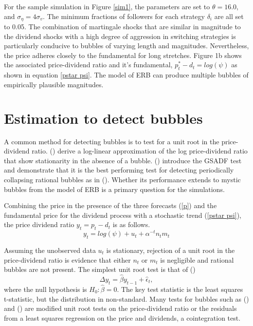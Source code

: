 \documentclass[12pt]{article}
\begin{document}
For the sample simulation in Figure \ref{sim1}, the parameters are set to $\theta=16.0$, and $\sigma_{\eta}=4\sigma_{v}$. The minimum fractions of followers for each strategy $\delta_{i}$ are all set to 0.05. The combination of martingale shocks that are similar in magnitude to the dividend shocks with a high degree of aggression in switching strategies is particularly conducive to bubbles of varying length and magnitudes. Nevertheless, the price adheres closely to the fundamental for long stretches. Figure 1b shows the associated price-dividend ratio and it's fundamental, $p^{*}_{t}-d_{t}=log(\psi)$ as shown in equation \ref{pstar psi}. The model of ERB can produce multiple bubbles of empirically plausible magnitudes.

\section{Estimation to detect bubbles}

A common method for detecting bubbles is to test for a unit root in the price-dividend ratio. \citeauthor{campbell1989dividend} (\citeyear{campbell1989dividend}) derive a log-linear approximation of the log price-dividend ratio that show stationarity in the absence of a bubble.
\citeauthor{phillips2015testing} (\citeyear{phillips2015testing}) introduce the GSADF test and demonstrate that it is the best performing test for detecting periodically collapsing rational bubbles as in \citeauthor{evans1991pitfalls} (\citeyear{evans1991pitfalls}). Whether its performance extends to mystic bubbles from the model of ERB is a primary question for the simulations. 

Combining the price in the presence of the three forecasts (\ref{p}) and the fundamental price for the dividend process with a stochastic trend (\ref{pstar psi}), the price dividend ratio $y_{t}=p_{t}-d_{t}$ is as follows.
\begin{equation}
    y_{t}=log(\psi)+u_{t}+\alpha^{-t} n_{t} m_{t}
    \label{yt}
\end{equation}

Assuming the unobserved data $u_{t}$ is stationary, rejection of a unit root in the price-dividend ratio is evidence that either $n_{t}$ or $m_{t}$ is negligible and rational bubbles are not present. The simplest unit root test is that of \citeauthor{dickey1979distribution} (\citeyear{dickey1979distribution})
\[
\Delta y_{t}=\hat{\beta} y_{t-1} + \hat{\epsilon}_{t},
\]
where the null hypothesis is $H_{0}: \hat{\beta}=0$. The key test statistic is the least squares t-statistic, but the distribution in non-standard. Many tests for bubbles such as \citeauthor{Bhargava1986} (\citeyear{Bhargava1986}) and \citeauthor{DibaGrossman1988} (\citeyear{DibaGrossman1988}) are modified unit root tests on the price-dividend ratio or the residuals from a least squares regression on the price and dividends, a cointegration test.
\end{document}
